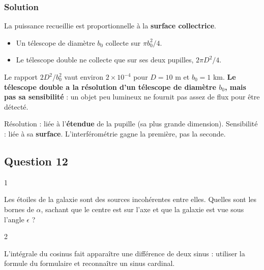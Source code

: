 \documentclass[11pt,a4paper]{article}
\providecommand{\tightlist}{\setlength{\itemsep}{0pt}\setlength{\parskip}{0pt}}
\begin{document}
\hypertarget{solution-10}{%
\subsubsection{Solution}\label{solution-10}}

La puissance recueillie est proportionnelle à la \textbf{surface collectrice}.

\begin{itemize}
\tightlist
\item
  Un télescope de diamètre \(b_0\) collecte sur \(\pi b_0^2/4\).
\item
  Le télescope double ne collecte que sur ses deux pupilles, \(2\pi D^2/4\).
\end{itemize}

Le rapport \(2D^2/b_0^2\) vaut environ \(2\times10^{-4}\) pour \(D=10\) m et \(b_0=1\) km. \textbf{Le télescope double a la résolution d'un télescope de diamètre \(b_0\), mais pas sa sensibilité} : un objet peu lumineux ne fournit pas assez de flux pour être détecté.

\begin{methode}

Résolution : liée à l'\textbf{étendue} de la pupille (sa plus grande dimension). Sensibilité : liée à sa \textbf{surface}. L'interférométrie gagne la première, pas la seconde.

\end{methode}

\hypertarget{question-12}{%
\subsection{Question 12}\label{question-12}}

\begin{indication}{1}

Les étoiles de la galaxie sont des sources incohérentes entre elles. Quelles sont les bornes de \(\alpha\), sachant que le centre est sur l'axe et que la galaxie est vue sous l'angle \(\epsilon\) ?

\end{indication}

\begin{indication}{2}

L'intégrale du cosinus fait apparaître une différence de deux sinus : utiliser la formule du formulaire et reconnaître un sinus cardinal.

\end{indication}
\end{document}
